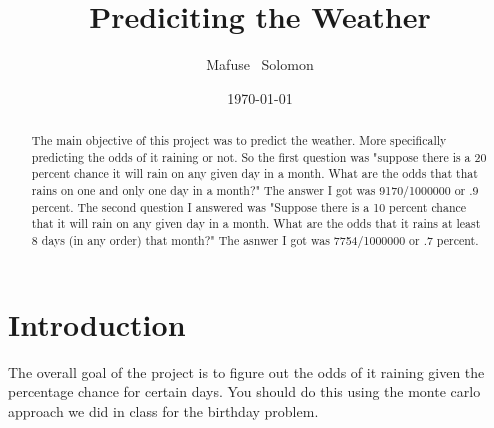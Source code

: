 \documentclass[twocolumn]{revtex4}
\begin{document}
\title{
Prediciting the Weather
}

\author{Mafuse ~Solomon}


\date{\today}

\begin{abstract}
The main objective of this project was to predict the weather.  More specifically predicting the odds of it raining or not. So the first question was "suppose there is a 20 percent chance it will rain on any given day in a month. What are the odds that that rains on one and only one day in a month?"  The answer I got was 9170/1000000 or .9 percent.  The second question I answered was "Suppose there is a 10 percent chance that it will rain on any given day in a month. What are the odds that it rains at least 8 days (in any order) that month?" The asnwer I got was 7754/1000000 or .7 percent.
\end{abstract}

\maketitle

\section{Introduction}
The overall goal of the project is to figure out the odds of it raining given the percentage chance for certain days.  You should do this using the monte carlo approach we did in class for the birthday problem.

\end{document}

